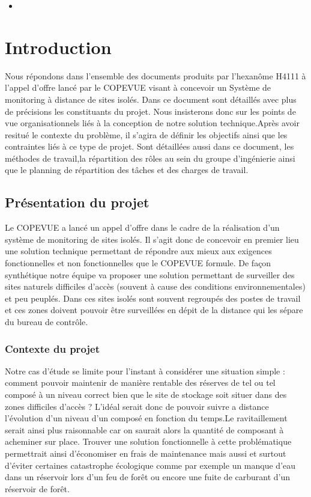 \begin{itemize}
\item
\end{itemize}

\section{Introduction}
Nous répondons dans l'ensemble des documents produits par l'hexanôme H4111 à l'appel d'offre lancé par le COPEVUE visant à concevoir un Système de monitoring à distance de sites isolés. Dans ce document sont détaillés avec plus de précisions les constituants  du projet. Nous insisterons donc sur les points de vue organisationnels liés à la conception de notre solution technique.Après avoir resitué le contexte du problème, il s'agira de définir les objectifs ainsi que les contraintes liés à ce type de projet. Sont détaillées aussi dans ce document, les méthodes de travail,la répartition des rôles au sein du groupe d'ingénierie ainsi que le planning de répartition des tâches et des charges de travail. 

\subsection{Présentation du projet}
Le COPEVUE a lancé un appel d'offre dans le cadre de la réalisation d'un système de monitoring de sites isolés. Il s'agit donc de concevoir en premier lieu une solution technique permettant de répondre aux mieux aux exigences fonctionnelles et non fonctionnelles que le COPEVUE formule. De façon synthétique notre équipe va proposer une solution permettant de surveiller des sites naturels difficiles d'accès (souvent à cause des conditions environnementales) et peu peuplés. Dans ces sites isolés sont souvent regroupés des postes de travail et ces zones doivent pouvoir être surveillées en dépit de la distance qui les sépare du bureau de contrôle.

\subsubsection{Contexte du projet}
Notre cas d'étude se limite pour l'instant à considérer une situation simple : comment pouvoir maintenir de manière rentable des réserves de tel ou tel composé à un niveau correct bien que le site de stockage soit situer dans des zones difficiles d'accès ? L'idéal serait donc de pouvoir suivre a distance l'évolution d'un niveau d'un composé en fonction du temps.Le ravitaillement serait ainsi plus raisonnable car on saurait alors la quantité de composant à acheminer sur place. Trouver une solution fonctionnelle à cette problématique permettrait ainsi d'économiser en frais de maintenance mais aussi et surtout d'éviter certaines catastrophe écologique comme par exemple un manque d'eau dans un réservoir lors d'un feu de forêt ou encore une fuite de carburant d'un réservoir de forêt.

